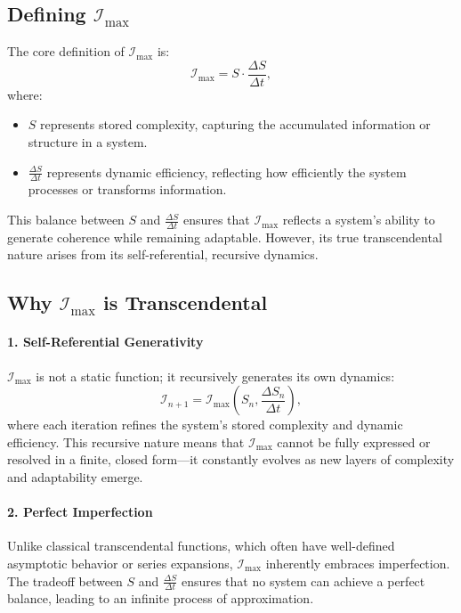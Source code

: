 \documentclass[12pt]{article}
\begin{document}
\subsection{Defining \(\mathcal{I}_{\text{max}}\)}

The core definition of \(\mathcal{I}_{\text{max}}\) is:
\[
\mathcal{I}_{\text{max}} = S \cdot \frac{\Delta S}{\Delta t},
\]
where:
\begin{itemize}
    \item \(S\) represents stored complexity, capturing the accumulated information or structure in a system.
    \item \(\frac{\Delta S}{\Delta t}\) represents dynamic efficiency, reflecting how efficiently the system processes or transforms information.
\end{itemize}

This balance between \(S\) and \(\frac{\Delta S}{\Delta t}\) ensures that \(\mathcal{I}_{\text{max}}\) reflects a system’s ability to generate coherence while remaining adaptable. However, its true transcendental nature arises from its self-referential, recursive dynamics.


\subsection{Why \(\mathcal{I}_{\text{max}}\) is Transcendental}

\paragraph{1. Self-Referential Generativity}
\(\mathcal{I}_{\text{max}}\) is not a static function; it recursively generates its own dynamics:
\[
\mathcal{I}_{n+1} = \mathcal{I}_{\text{max}}(S_n, \frac{\Delta S_n}{\Delta t}),
\]
where each iteration refines the system's stored complexity and dynamic efficiency. This recursive nature means that \(\mathcal{I}_{\text{max}}\) cannot be fully expressed or resolved in a finite, closed form—it constantly evolves as new layers of complexity and adaptability emerge.

\paragraph{2. Perfect Imperfection}
Unlike classical transcendental functions, which often have well-defined asymptotic behavior or series expansions, \(\mathcal{I}_{\text{max}}\) inherently embraces imperfection. The tradeoff between \(S\) and \(\frac{\Delta S}{\Delta t}\) ensures that no system can achieve a perfect balance, leading to an infinite process of approximation.
\end{document}
